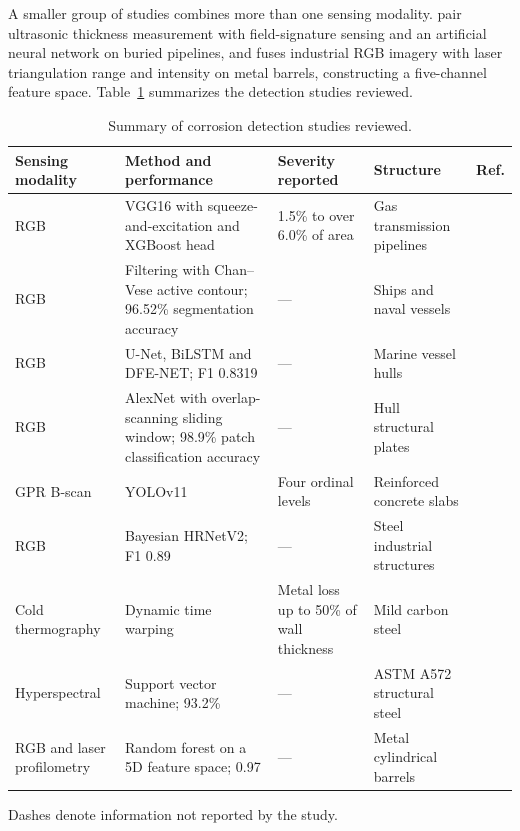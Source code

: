 A smaller group of studies combines more than one sensing modality.
\citet{Huang2026a} pair ultrasonic thickness measurement with field-signature
sensing and an artificial neural network on buried pipelines, and
\citet{Haitz2022} fuses industrial RGB imagery with laser triangulation range and
intensity on metal barrels, constructing a five-channel feature space.
Table~\ref{tab:corrosion-detection} summarizes the detection studies reviewed.

\begin{table}[htbp]
\centering
\caption{Summary of corrosion detection studies reviewed.}
\label{tab:corrosion-detection}
\scriptsize
\renewcommand{\arraystretch}{1.15}
\begin{tabularx}{\textwidth}{@{}X X X X l@{}}
\toprule
\textbf{Sensing modality} & \textbf{Method and performance} & \textbf{Severity reported} & \textbf{Structure} & \textbf{Ref.} \\
\midrule
RGB & VGG16 with squeeze-and-excitation and XGBoost head & 1.5\% to over 6.0\% of area & Gas transmission pipelines & \citep{Alvani2026} \\
RGB & Filtering with Chan--Vese active contour; 96.52\% segmentation accuracy & --- & Ships and naval vessels & \citep{Imran2025} \\
RGB & U-Net, BiLSTM and DFE-NET; F1 0.8319 & --- & Marine vessel hulls & \citep{Yu2022} \\
RGB & AlexNet with overlap-scanning sliding window; 98.9\% patch classification accuracy & --- & Hull structural plates & \citep{Yao2019} \\
GPR B-scan & YOLOv11 & Four ordinal levels & Reinforced concrete slabs & \citep{Bui2026} \\
RGB & Bayesian HRNetV2; F1 0.89 & --- & Steel industrial structures & \citep{Nash2022} \\
Cold thermography & Dynamic time warping & Metal loss up to 50\% of wall thickness & Mild carbon steel & \citep{Doshvarpassand2022} \\
Hyperspectral & Support vector machine; 93.2\% & --- & ASTM A572 structural steel & \citep{Lavadiya2022} \\
RGB and laser profilometry & Random forest on a 5D feature space; 0.97 & --- & Metal cylindrical barrels & \citep{Haitz2022} \\
\bottomrule
\end{tabularx}

\vspace{4pt}
\scriptsize Dashes denote information not reported by the study.
\end{table}


